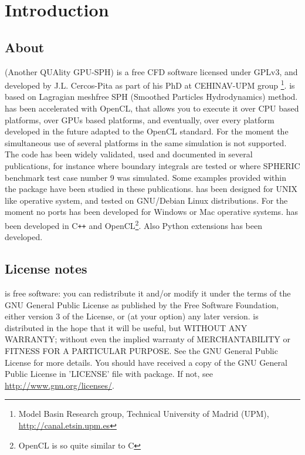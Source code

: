 \chapter{Introduction}
\label{s:introduction}
%
\section{About \NAME}
%
\NAME (Another QUAlity GPU-SPH) is a free CFD software licensed under GPLv3,
and developed by J.L. Cercos-Pita as part of his PhD at CEHINAV-UPM group
\footnote{Model Basin Research group, Technical University of Madrid (UPM),
\url{http://canal.etsin.upm.es}}. \NAME is based on Lagragian meshfree SPH
(Smoothed Particles Hydrodynamics) method.\rc
%
\NAME has been accelerated with OpenCL, that allows you to execute it over
CPU based platforms, over GPUs based platforms, and eventually, over every platform
developed in the future adapted to the OpenCL standard. For the moment the simultaneous
use of several platforms in the same simulation is not supported.\rc
%
The code has been widely validated, used and documented in several publications, for
instance \citet{Maciaetal_PTP_2012} where boundary integrals are tested or
\citet{perezrojas_cercos_stab12} where SPHERIC benchmark test case number 9 was simulated.
Some examples provided within the package have been studied in these publications.\rc
%
\NAME has been designed for UNIX like operative system, and tested on GNU/Debian Linux
distributions. For the moment no ports has been developed for Windows or Mac operative
systems.
%
\NAME has been developed in C\texttt{++} and OpenCL\footnote{OpenCL is so quite similar
to C}. Also Python extensions has been developed.
%
\section{License notes}
%
\NAME is free software: you can redistribute it and/or modify
it under the terms of the GNU General Public License as published by
the Free Software Foundation, either version 3 of the License, or
(at your option) any later version.\rc
%
\NAME is distributed in the hope that it will be useful,
but WITHOUT ANY WARRANTY; without even the implied warranty of
MERCHANTABILITY or FITNESS FOR A PARTICULAR PURPOSE.  See the
GNU General Public License for more details.\rc
%
You should have received a copy of the GNU General Public License
in 'LICENSE' file with \NAME package. If not, see
\url{http://www.gnu.org/licenses/}.
%
